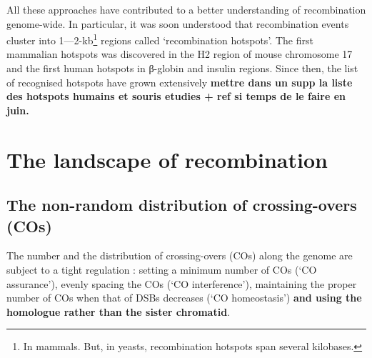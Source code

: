 All these approaches have contributed to a better understanding of recombination genome-wide.
In particular, it was soon understood that recombination events cluster into 1—2-kb\footnote{In mammals. But, in yeasts, recombination hotspots span several kilobases.} regions called ‘recombination hotspots’.%
The first mammalian hotspots was discovered in the H2 region of mouse chromosome 17 \citep{steinmetz1982molecular} and the first human hotspots in \textgreek{β}-globin \citep{chakravarti1984nonuniform} and insulin \citep{chakravarti1986evidence} regions. Since then, the list of recognised hotspots have grown extensively \citep[reviewed in][]{arnheim2007mammalian,paigen2010mammalian} \textbf{mettre dans un supp la liste des hotspots humains et souris etudies + ref si temps de le faire en juin.}









\section{The landscape of recombination}
\subsection{The non-random distribution of crossing-overs (COs)}

The number and the distribution of crossing-overs (COs) along the genome are subject to a tight regulation \citep[reviewed in][]{jones1984control, jones2006meiotic}: setting a minimum number of COs (‘CO assurance’), evenly spacing the COs (‘CO interference’), maintaining the proper number of COs when that of DSBs decreases (‘CO homeostasis’) \textbf{and using the homologue rather than the sister chromatid}.

%






